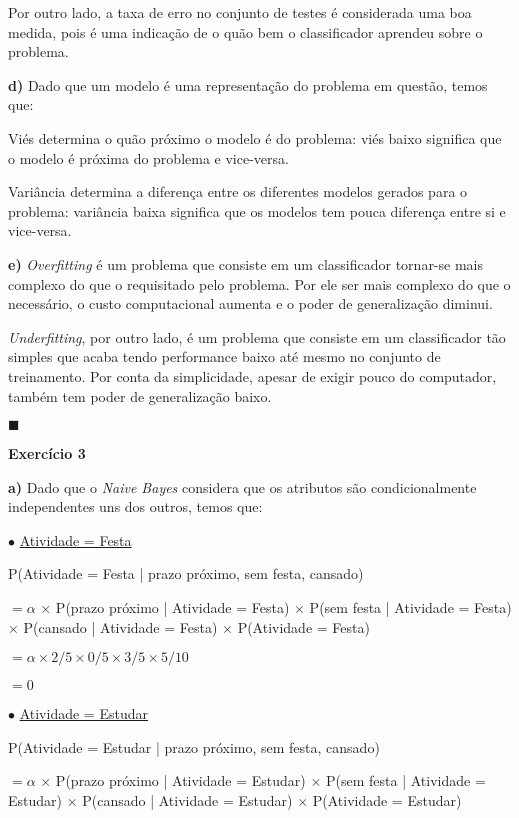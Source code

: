 \documentclass{article}
\begin{document}
\quad Por outro lado, a taxa de erro no conjunto de testes é considerada uma boa medida, pois é uma indicação de o quão bem o classificador aprendeu sobre o problema.

\bigskip
\quad \textbf{d)} Dado que um modelo é uma representação do problema em questão, temos que:

\quad Viés determina o quão próximo o modelo é do problema: viés baixo significa que o modelo é próxima do problema e vice-versa.

\quad Variância determina a diferença entre os diferentes modelos gerados para o problema: variância baixa significa que os modelos tem pouca diferença entre si e vice-versa.

\bigskip
\quad \textbf{e)} \textit{Overfitting} é um problema que consiste em um classificador tornar-se mais complexo do que o requisitado pelo problema. Por ele ser mais complexo do que o necessário, o custo computacional aumenta e o poder de generalização diminui.

\quad \textit{Underfitting}, por outro lado, é um problema que consiste em um classificador tão simples que acaba tendo performance baixo até mesmo no conjunto de treinamento. Por conta da simplicidade, apesar de exigir pouco do computador, também tem poder de generalização baixo.

\begin{flushright}
$\blacksquare$
\end{flushright}

\textbf{\Large{Exercício 3}}

\quad \textbf{a)} Dado que o \textit{Naive Bayes} considera que os atributos são condicionalmente independentes uns dos outros, temos que:

\quad $\bullet$ \underline{Atividade = Festa}

\quad P(Atividade = Festa | prazo próximo, sem festa, cansado)

\quad $= \alpha$ $\times$ P(prazo próximo | Atividade = Festa) $\times$ P(sem festa | Atividade = Festa) $\times$ P(cansado | Atividade = Festa) $\times$ P(Atividade = Festa)

\quad $= \alpha \times 2/5 \times 0/5 \times 3/5 \times 5/10$

\quad $= 0$

\bigskip
\quad $\bullet$ \underline{Atividade = Estudar}

\quad P(Atividade = Estudar | prazo próximo, sem festa, cansado)

\quad $= \alpha$ $\times$ P(prazo próximo | Atividade = Estudar) $\times$ P(sem festa | Atividade = Estudar) $\times$ P(cansado | Atividade = Estudar) $\times$ P(Atividade = Estudar) 
\end{document}
